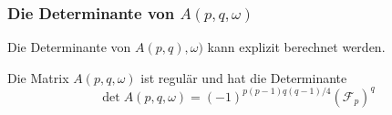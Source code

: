 %
%
\subsubsection{Die Determinante von $A(p,q,\omega)$}
Die Determinante von $A(p,q),\omega)$ kann explizit berechnet werden.

%
%
\begin{satz}
\label{buch:diskret:vandermonde:hauptsatz}
Die Matrix $A(p,q,\omega)$ ist regulär und hat die Determinante
\begin{equation}
\det A(p,q,\omega)
=
(-1)^{p(p-1)q(q-1)/4}
(\mathscr{F}_p)^q
\label{buch:diskret:vandermonde:eqn:detA}
\end{equation}
\end{satz}


